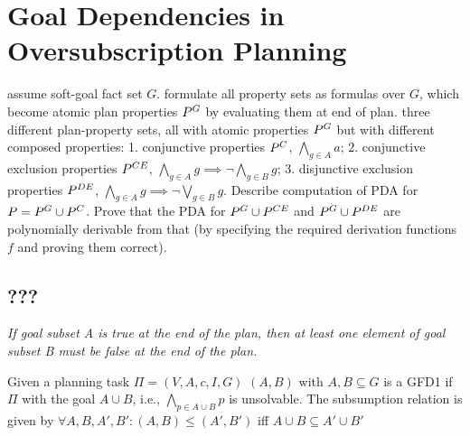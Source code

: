 \section{Goal Dependencies in Oversubscription Planning}
\label{goaldep}


assume soft-goal fact set $G$. formulate all property sets as formulas
over $G$, which become atomic plan properties $P^{G}$ by
evaluating them at end of plan. three different plan-property sets,
all with atomic properties $P^{G}$ but with different composed
properties: 1. conjunctive properties $P^{C}$, $\bigwedge_{g \in
  A} a$; 2. conjunctive exclusion properties $P^{CE}$,
$\bigwedge_{g \in A} g \implies \neg \bigwedge_{g \in B} g$;
3. disjunctive exclusion properties $P^{DE}$, $\bigwedge_{g \in
  A} g \implies \neg \bigvee_{g \in B} g$. Describe computation of PDA
for $P = P^{G} \cup P^{C}$. Prove that the PDA for
$P^{G} \cup P^{CE}$ and $P^{G} \cup P^{DE}$ are
polynomially derivable from that (by specifying the required
derivation functions $f$ and proving them correct). 




\subsection{???}


\emph{If goal subset A is true at the end of the plan, then at least one element of goal subset B
must be false at the end of the plan.}


\begin{definition}
Given a planning task $\Pi = (V,A,c,I,G)$ $(A,B)$ with $A, B \subseteq G$ is a 
GFD1 if $\Pi$ with the goal $A \cup B$, i.e., $\bigwedge_{p \in A \cup B} p$
is unsolvable.
The subsumption relation is given by $\forall A,B,A',B': (A,B) \leq (A',B')$ iff $A \cup B \subseteq 
A' \cup B'$
\end{definition}

